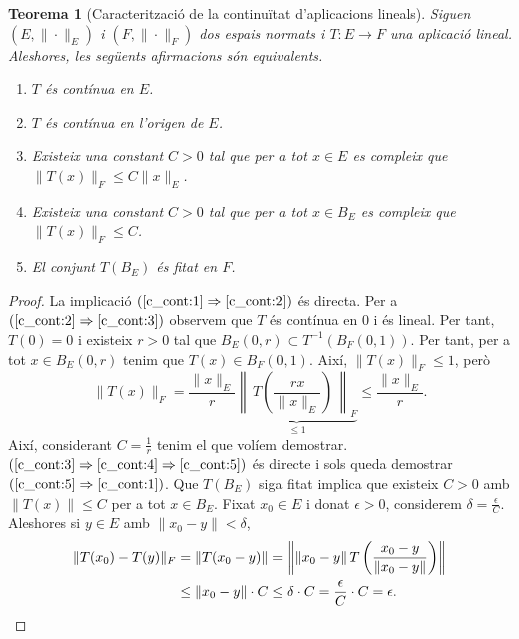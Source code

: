 \documentclass[12pt]{book}
\newtheorem{teorema}{Teorema}[chapter]
\theoremstyle{definition}
\theoremstyle{nota}
\theoremstyle{exemple}
\begin{document}
\begin{teorema}[Caracterització de la continuïtat d'aplicacions lineals]
  \label{teo:caracterització_continuïtat}
  Siguen $(E, \|\cdot\|_E)$ i $(F, \|\cdot\|_F)$ dos espais normats i
  $T : E \to F$ una aplicació lineal. Aleshores, les següents
  afirmacions són equivalents.
  \begin{enumerate}
  \item\label{c_cont:1} $T$ és contínua en $E$.
  \item\label{c_cont:2} $T$ és contínua en l'origen de $E$.
  \item\label{c_cont:3} Existeix una constant $C > 0$ tal que per a
    tot $x \in E$ es compleix que $\|T(x)\|_F \leq C \|x\|_E$.
  \item\label{c_cont:4} Existeix una constant $C > 0$ tal que per a
    tot $x \in B_E$ es compleix que $\|T(x)\|_F \leq C$.
  \item\label{c_cont:5} El conjunt $T(B_E)$ és fitat en $F$.
  \end{enumerate}
\end{teorema}

\begin{proof}
  La implicació $(\ref{c_cont:1} \Rightarrow \ref{c_cont:2})$ és
  directa. Per a $(\ref{c_cont:2} \Rightarrow \ref{c_cont:3})$
  observem que $T$ és contínua en $0$ i és lineal. Per tant,
  $T(0) = 0$ i existeix $r > 0$ tal que
  $B_E(0,r) \subset T^{-1}(B_F(0,1))$. Per tant, per a tot
  $x \in B_E(0,r)$ tenim que $T(x) \in B_F(0,1)$. Així,
  $\|T(x)\|_F \leq 1$, però
  \[
    \|T(x)\|_F = \frac{\|x\|_E}{r} \underbrace{\left\| \,
        T\left(\frac{rx}{\|x\|_E}\right) \, \right\|_F}_{\leq 1} \leq
    \frac{\|x\|_E}{r}.
  \]
  Així, considerant $C = \frac{1}{r}$ tenim el que volíem demostrar.
  $(\ref{c_cont:3} \Rightarrow \ref{c_cont:4} \Rightarrow
  \ref{c_cont:5})$ és directe i sols queda demostrar
  $(\ref{c_cont:5} \Rightarrow \ref{c_cont:1})$. Que $T(B_E)$ siga
  fitat implica que existeix $C > 0$ amb $\|T(x)\| \leq C$ per a tot
  $x \in B_E$. Fixat $x_0 \in E$ i donat $\epsilon > 0$, considerem
  $\delta = \frac{\epsilon}{C}$. Aleshores si $y \in E$ amb
  $\|x_0 - y\| < \delta$,
  \begin{align*}
    \|T(x_0) - T(y)\|_F
    &= \|T(x_0 - y)\| =
      \left\| \|x_0-y\| \, T \left( \frac{x_0 - y}{\|x_0 - y\|}\right) \right\| \\
    &\leq \|x_0 - y\| \cdot C \leq \delta \cdot C = \frac{\epsilon}{C} \cdot C = \epsilon.\qedhere
  \end{align*}
\end{proof}
\end{document}
